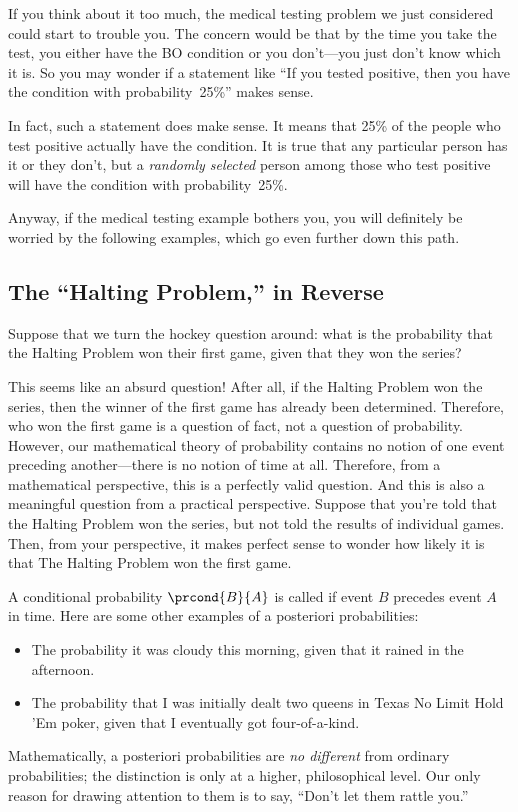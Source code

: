 If you think about it too much, the medical testing problem we just
considered could start to trouble you.  The concern would be that by
the time you take the test, you either have the BO condition or you
don't---you just don't know which it is.  So you may wonder if a
statement like ``If you tested positive, then you have the condition
with probability~25\%'' makes sense.

In fact, such a statement does make sense.  It means that 25\% of the
people who test positive actually have the condition.  It is true that
any particular person has it or they don't, but a \emph{randomly
  selected} person among those who test positive will have the
condition with probability~25\%.

Anyway, if the medical testing example bothers you, you will
definitely be worried by the following examples, which go even further
down this path.

\subsection{The ``Halting Problem,'' in Reverse}

Suppose that we turn the hockey question around: what is the
probability that the Halting Problem won their first game, given that
they won the series?

This seems like an absurd question!  After all, if the Halting Problem
won the series, then the winner of the first game has already been
determined.  Therefore, who won the first game is a question of fact,
not a question of probability.  However, our mathematical theory of
probability contains no notion of one event preceding another---there
is no notion of time at all.  Therefore, from a mathematical
perspective, this is a perfectly valid question.  And this is also a
meaningful question from a practical perspective.  Suppose that you're
told that the Halting Problem won the series, but not told the results
of individual games.  Then, from your perspective, it makes perfect
sense to wonder how likely it is that The Halting Problem won the
first game.

A conditional probability $\prcond{B}{A}$ is called   if event $B$ precedes event $A$ in time.  Here are some
other examples of a posteriori probabilities:
%
\begin{itemize}
\item The probability it was cloudy this morning, given that it rained
in the afternoon.
\item The probability that I was initially dealt two queens in Texas
No Limit Hold 'Em poker, given that I eventually got four-of-a-kind.
\end{itemize}
%
Mathematically, a posteriori probabilities are \emph{no different}
from ordinary probabilities; the distinction is only at a higher,
philosophical level.  Our only reason for drawing attention to them is
to say, ``Don't let them rattle you.''

